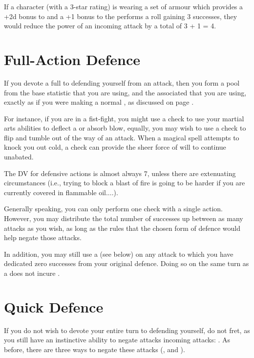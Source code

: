 If a character (with a 3-star  rating) is wearing a set of armour which provides a +2d bonus to  and a +1 bonus to the  performs a  roll gaining 3 successes, they would reduce the power of an incoming attack by a total of 3 + 1 = 4.  

\section{Full-Action Defence}

If you devote a full  to defending yourself from an attack, then you form a pool from the base  statistic that you are using, and the associated  that you are using, exactly as if you were making a normal , as discussed on page \pageref{C:Checks}. 

For instance, if you are in a fist-fight, you might use a  check to use your martial arts abilities to deflect a or absorb blow, equally, you may wish to use a  check to flip and tumble out of the way of an attack. When a magical spell attempts to knock you out cold, a  check can provide the sheer force of will to continue unabated. 

The DV for defensive actions is almost always 7, unless there are extenuating circumstances (i.e., trying to block a blast of fire is going to be harder if you are currently covered in flammable oil....).

Generally speaking, you can only perform one  check with a single action. However, you may distribute the total number of successes up between as many attacks as you wish, as long as the  rules that the chosen form of defence would help negate those attacks. 

In addition, you may still use a  (see below) on any attack to which you have dedicated zero successes from your original defence. Doing so on the same turn as a  does not incure . 

\section{Quick Defence}

If you do not wish to devote your entire turn to defending yourself, do not fret, as you still have an instinctive ability to negate attacks incoming attacks: . As before, there are three ways to negate these attacks (,  and ).

